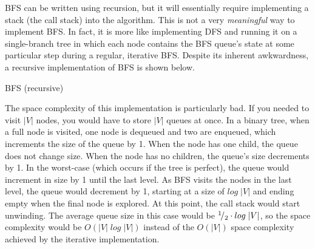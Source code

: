 BFS can be written using recursion, but it will essentially require implementing a stack (the call stack) into the algorithm. This is not a very \textit{meaningful} way to implement BFS. In fact, it is more like implementing DFS and running it on a single-branch tree in which each node contains the BFS queue's state at some particular step during a regular, iterative BFS. Despite its inherent awkwardness, a recursive implementation of BFS is shown below. \\

\begin{algorithm}[H]
	\vspace{2mm}
	\caption{BFS (recursive)}
\end{algorithm}
\vspace{5mm}

The space complexity of this implementation is particularly bad. If you needed to visit $|V|$ nodes, you would have to store $|V|$ queues at once. In a binary tree, when a full node is visited, one node is dequeued and two are enqueued, which increments the size of the queue by 1. When the node has one child, the queue does not change size. When the node has no children, the queue's size decrements by 1. In the worst-case (which occurs if the tree is perfect), the queue would increment in size by 1 until the last level. As BFS visits the nodes in the last level, the queue would decrement by 1, starting at a size of $log\;|V|$ and ending empty when the final node is explored. At this point, the call stack would start unwinding. The average queue size in this case would be ${}^{1}\!/_{2}\cdot log\;|V|$, so the space complexity would be $O(|V|\;log\;|V|)$ instead of the $O(|V|)$ space complexity achieved by the iterative implementation. \\

